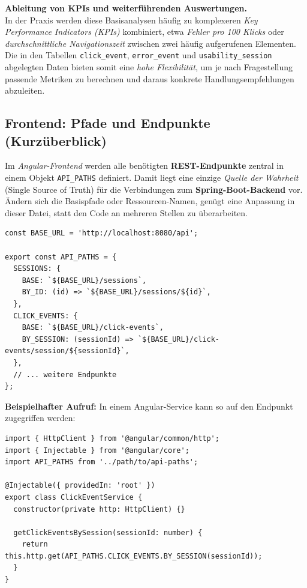 \documentclass[12pt,oneside]{article}
\begin{document}
\noindent
\textbf{Ableitung von KPIs und weiterführenden Auswertungen.}\\
In der Praxis werden diese Basisanalysen häufig zu komplexeren \emph{Key Performance Indicators (KPIs)} kombiniert, etwa \emph{Fehler pro 100 Klicks} oder \emph{durchschnittliche Navigationszeit} zwischen zwei häufig aufgerufenen Elementen. Die in den Tabellen \lstinline|click_event|, \lstinline|error_event| und \lstinline|usability_session| abgelegten Daten bieten somit eine \emph{hohe Flexibilität}, um je nach Fragestellung passende Metriken zu berechnen und daraus konkrete Handlungsempfehlungen abzuleiten.

 \subsection{Frontend: Pfade und Endpunkte (Kurzüberblick)}
\label{subsec:frontend_endpoints}

Im \textit{Angular-Frontend} werden alle benötigten \textbf{REST-Endpunkte} zentral in einem Objekt \lstinline|API_PATHS| definiert. Damit liegt eine einzige \emph{Quelle der Wahrheit} (Single Source of Truth) für die Verbindungen zum \textbf{Spring-Boot-Backend} vor. Ändern sich die Basispfade oder Ressourcen-Namen, genügt eine Anpassung in dieser Datei, statt den Code an mehreren Stellen zu überarbeiten.

\begin{lstlisting}
const BASE_URL = 'http://localhost:8080/api';

export const API_PATHS = {
  SESSIONS: {
    BASE: `${BASE_URL}/sessions`,
    BY_ID: (id) => `${BASE_URL}/sessions/${id}`,
  },
  CLICK_EVENTS: {
    BASE: `${BASE_URL}/click-events`,
    BY_SESSION: (sessionId) => `${BASE_URL}/click-events/session/${sessionId}`,
  },
  // ... weitere Endpunkte
};
\end{lstlisting}

\noindent
\textbf{Beispielhafter Aufruf:} In einem Angular-Service kann so auf den Endpunkt zugegriffen werden:
\begin{lstlisting}
import { HttpClient } from '@angular/common/http';
import { Injectable } from '@angular/core';
import API_PATHS from '../path/to/api-paths';

@Injectable({ providedIn: 'root' })
export class ClickEventService {
  constructor(private http: HttpClient) {}

  getClickEventsBySession(sessionId: number) {
    return this.http.get(API_PATHS.CLICK_EVENTS.BY_SESSION(sessionId));
  }
}
\end{lstlisting}
\end{document}
